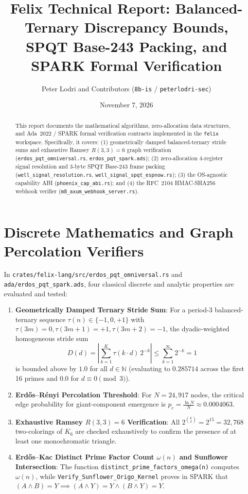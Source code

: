 \documentclass[11pt,a4paper]{article}
\title{Felix Technical Report: Balanced-Ternary Discrepancy Bounds,\\
SPQT Base-243 Packing, and SPARK Formal Verification}
\author{Peter Lodri and Contributors (\texttt{8b-is} / \texttt{peterlodri-sec})}
\date{November 7, 2026}
\begin{document}
\maketitle

\begin{abstract}
This report documents the mathematical algorithms, zero-allocation data structures, and Ada~2022 / SPARK formal verification contracts implemented in the \texttt{felix} workspace. Specifically, it covers: (1) geometrically damped balanced-ternary stride sums and exhaustive Ramsey $R(3,3)=6$ graph verification (\texttt{erdos\_pqt\_omniversal.rs}, \texttt{erdos\_pqt\_spark.ads}); (2) zero-allocation 4-register signal resolution and 3-byte SPQT Base-243 frame packing (\texttt{well\_signal\_resolution.rs}, \texttt{well\_signal\_spqt\_espnow.rs}); (3) the OS-agnostic capability ABI (\texttt{phoenix\_cap\_abi.rs}); and (4) the RFC~2104 HMAC-SHA256 webhook verifier (\texttt{m8\_axum\_webhook\_server.rs}).
\end{abstract}

\section{Discrete Mathematics and Graph Percolation Verifiers}

In \texttt{crates/felix-lang/src/erdos\_pqt\_omniversal.rs} and \texttt{ada/erdos\_pqt\_spark.ads}, four classical discrete and analytic properties are evaluated and tested:

\begin{enumerate}
  \item \textbf{Geometrically Damped Ternary Stride Sum}: For a period-3 balanced-ternary sequence $\tau(n) \in \{-1, 0, +1\}$ with $\tau(3m) = 0, \tau(3m+1) = +1, \tau(3m+2) = -1$, the dyadic-weighted homogeneous stride sum
  \[
    D(d) = \left| \sum_{k=1}^{K} \tau(k \cdot d) \, 2^{-k} \right| \le \sum_{k=1}^{\infty} 2^{-k} = 1
  \]
  is bounded above by $1.0$ for all $d \in \mathbb{N}$ (evaluating to $0.285714$ across the first 16 primes and $0.0$ for $d \equiv 0 \pmod{3}$).
  \item \textbf{Erd\H{o}s--R\'enyi Percolation Threshold}: For $N = 24{,}917$ nodes, the critical edge probability for giant-component emergence is $p_c = \frac{\ln N}{N} \approx 0.0004063$.
  \item \textbf{Exhaustive Ramsey $R(3,3)=6$ Verification}: All $2^{\binom{6}{2}} = 2^{15} = 32{,}768$ two-colorings of $K_6$ are checked exhaustively to confirm the presence of at least one monochromatic triangle.
  \item \textbf{Erd\H{o}s--Kac Distinct Prime Factor Count $\omega(n)$ and Sunflower Intersection}: The function \texttt{distinct\_prime\_factors\_omega(n)} computes $\omega(n)$, while \texttt{Verify\_Sunflower\_Origo\_Kernel} proves in SPARK that $(A \wedge B) = Y \implies (A \wedge Y) = Y \wedge (B \wedge Y) = Y$.
\end{enumerate}
\end{document}
